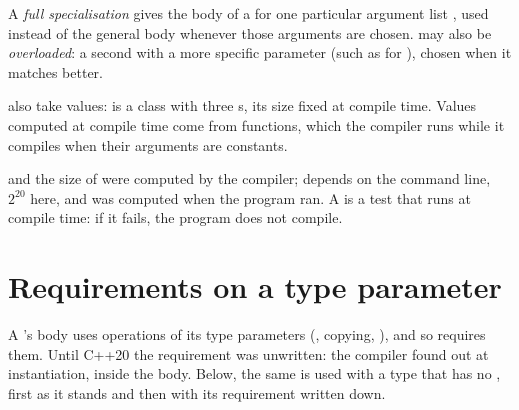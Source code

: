 \begin{definition}\label{def:b2:cpp-templates:specialisation}
A \emph{full specialisation}  gives the body of a
 for one particular argument list , used instead of the general body whenever those arguments are
chosen.  may also be \emph{overloaded}: a second  with a more specific parameter (such as
 for ), chosen when it matches better.
\end{definition}

\label{lst:b2:cpp-templates:specialise}

\label{out:b2:cpp-templates:specialise}

 also take values:  is a class with three s, its size fixed at
compile time. Values computed at compile time come from  functions, which the compiler runs while
it compiles when their arguments are constants.

\label{lst:b2:cpp-templates:constexpr}

\label{out:b2:cpp-templates:constexpr}

 and the size of  were computed by the compiler;  depends on the
command line, $2^{20}$ here, and was computed when the program ran. A  is a test that runs at
compile time: if it fails, the program does not compile.

\section{Requirements on a type parameter}\label{sec:b2:cpp-templates:concepts}

A 's body uses operations of its type parameters (\code{<}, copying, \code{+}), and so requires them. Until
C++20 the requirement was unwritten: the compiler found out at instantiation, inside the body. Below, the same
 is used with a type that has no \code{<}, first as it stands and then with its requirement written
down.

